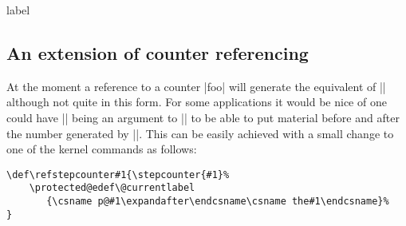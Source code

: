   \begin{docCommand}{label}{}
  \end{docCommand}




 \subsection{An extension of counter referencing}

 At the moment a reference to a counter |foo| will generate the
 equivalent of |\p@foo\thefoo| although not quite in this form.  For
 some applications it would be nice of one could have |\thefoo| being
 an argument to |\p@foo| to be able to put material before and after
 the number generated by |\thefoo|. This can be easily achieved with
 a small change to one of the kernel commands as follows:

\begin{verbatim}
\def\refstepcounter#1{\stepcounter{#1}%
    \protected@edef\@currentlabel
       {\csname p@#1\expandafter\endcsname\csname the#1\endcsname}%
}
\end{verbatim}

